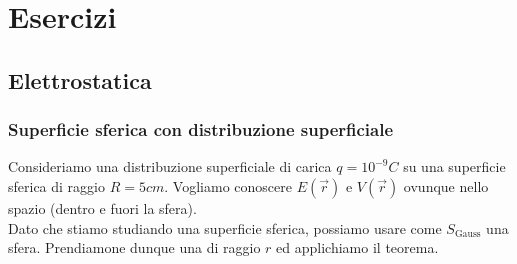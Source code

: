\documentclass[a4paper,12pt,titlepage,openany]{book}
\theoremstyle{mydef}
\begin{document}
    \appendix
    \chapter{Esercizi}
    \section{Elettrostatica}
        \subsection{Superficie sferica con distribuzione superficiale}\label{es:1}
            \begin{figure}
            \end{figure}
            Consideriamo una distribuzione superficiale di carica $q=10^{-9}C$ su una superficie sferica di raggio $R=5cm$.
            Vogliamo conoscere $E(\vec{r})$ e $V(\vec{r})$ ovunque nello spazio (dentro e fuori la sfera).\\
            
            Dato che stiamo studiando una superficie sferica, possiamo usare come $S_{\text{Gauss}}$ una sfera. Prendiamone dunque una
            di raggio $r$ ed applichiamo il teorema.\\
            
            
\end{document}
